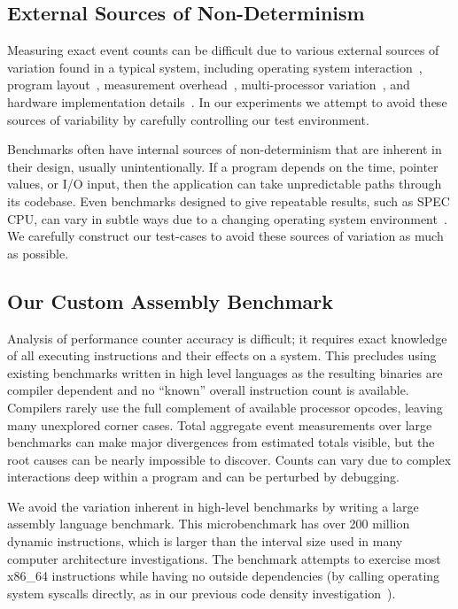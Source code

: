 \subsection{External Sources of Non-Determinism}

Measuring exact event counts can be difficult due to various 
external sources of variation found in a typical system, including
operating system interaction~\cite{mcguire+:rtlw09},
program layout~\cite{weaver+:iiswc08,mytkowicz+:asplos09},
measurement overhead~\cite{zaparanuks+:ispass09},
multi-processor variation~\cite{alameldeen+:hpca03}, and
hardware implementation details~\cite{weaver+:iiswc08,weaver:thesis10}.
In our experiments we attempt to avoid these sources of variability by
carefully controlling our test environment.

Benchmarks often have internal sources of non-determinism
that are inherent in their design, usually unintentionally.
If a program depends on the time, pointer values, or I/O input,
then the application can take unpredictable paths through its
codebase.
Even benchmarks designed to give repeatable results,
such as SPEC CPU, can vary in subtle ways due to a changing
operating system environment~\cite{weaver+:iiswc08}.
We carefully construct our test-cases to avoid 
these sources of variation as much as possible.

\subsection{Our Custom Assembly Benchmark}

Analysis of performance counter accuracy is difficult;
it requires exact knowledge of all executing instructions
and their effects on a system.
This precludes using existing benchmarks written in high level languages 
as the resulting binaries are compiler dependent and no
``known'' overall instruction count is available.
Compilers rarely use the full complement of available 
processor opcodes, leaving many unexplored corner cases.
Total aggregate event measurements over large benchmarks can
make major divergences from estimated totals visible, 
but the root causes can be nearly impossible 
to discover.  
Counts can vary due to complex interactions
deep within a program and can be perturbed by debugging.

We avoid the variation inherent in high-level benchmarks
by writing a large assembly language benchmark. 
This microbenchmark has over 200 million dynamic instructions,
which is larger than the interval size used in many computer 
architecture investigations.
The benchmark attempts to exercise most x86\_64 instructions
while having no outside dependencies (by calling 
operating system syscalls directly, as in 
our previous code density investigation~\cite{weaver+:iccd09}).

